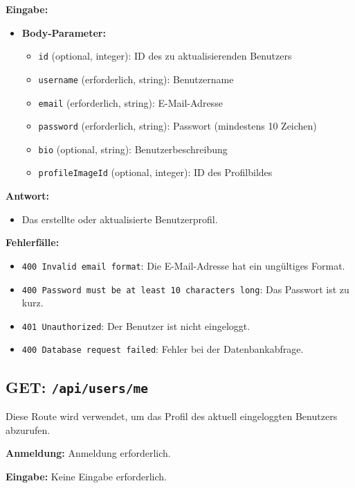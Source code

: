 \documentclass[a4paper,12pt]{article}
\begin{document}
\textbf{Eingabe:}
\begin{itemize}
    \item \textbf{Body-Parameter:}
    \begin{itemize}
        \item \texttt{id} (optional, integer):
            ID des zu aktualisierenden Benutzers
        \item \texttt{username} (erforderlich, string):
            Benutzername
        \item \texttt{email} (erforderlich, string):
            E-Mail-Adresse
        \item \texttt{password} (erforderlich, string):
            Passwort (mindestens 10 Zeichen)
        \item \texttt{bio} (optional, string):
            Benutzerbeschreibung
        \item \texttt{profileImageId} (optional, integer):
            ID des Profilbildes
    \end{itemize}
\end{itemize}

\textbf{Antwort:}
\begin{itemize}
    \item Das erstellte oder aktualisierte Benutzerprofil.
\end{itemize}

\textbf{Fehlerfälle:}
\begin{itemize}
    \item \texttt{400 Invalid email format}:
        Die E-Mail-Adresse hat ein ungültiges Format.
    \item \texttt{400 Password must be at least 10 characters long}:
        Das Passwort ist zu kurz.
    \item \texttt{401 Unauthorized}:
        Der Benutzer ist nicht eingeloggt.
    \item \texttt{400 Database request failed}:
        Fehler bei der Datenbankabfrage.
\end{itemize}

\newpage
\subsection{GET: \texttt{/api/users/me}}

Diese Route wird verwendet, um das Profil des aktuell eingeloggten Benutzers abzurufen.

\textbf{Anmeldung:} Anmeldung erforderlich.

\textbf{Eingabe:} Keine Eingabe erforderlich.
\end{document}
